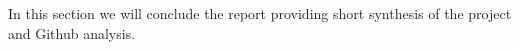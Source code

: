 \documentclass[main.tex]{subfiles}
\begin{document}
In this section we will conclude the report providing short synthesis of the project and Github analysis.\\
\end{document}
